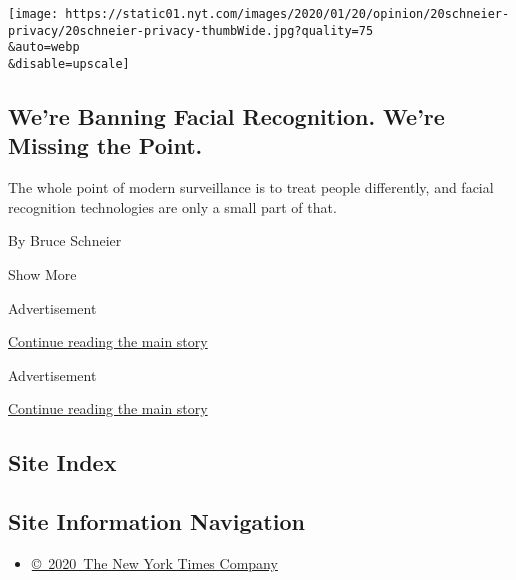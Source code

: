\begin{enumerate}
  \texttt{[image: https://static01.nyt.com/images/2020/01/20/opinion/20schneier-privacy/20schneier-privacy-thumbWide.jpg?quality=75\\\&auto=webp\\\&disable=upscale]}

  \hypertarget{were-banning-facial-recognition-were-missing-the-point}{%
  \subsection{We're Banning Facial Recognition. We're Missing the
  Point.}\label{were-banning-facial-recognition-were-missing-the-point}}

  The whole point of modern surveillance is to treat people differently,
  and facial recognition technologies are only a small part of that.

  By Bruce Schneier
\end{enumerate}

Show More

Advertisement

\protect\hyperlink{after-mid1}{Continue reading the main story}

Advertisement

\protect\hyperlink{after-mktg}{Continue reading the main story}

\hypertarget{site-index}{%
\subsection{Site Index}\label{site-index}}

\hypertarget{site-information-navigation}{%
\subsection{Site Information
Navigation}\label{site-information-navigation}}

\begin{itemize}
\tightlist
\item
  \href{https://help.nytimes.com/hc/en-us/articles/115014792127-Copyright-notice}{©~2020~The
  New York Times Company}
\end{itemize}

